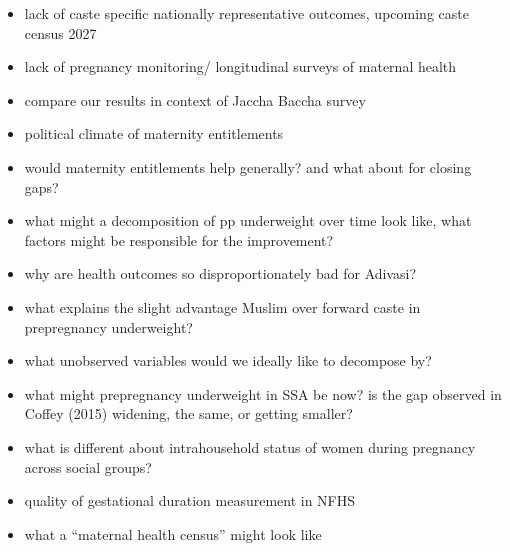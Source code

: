 \documentclass[12pt]{article}
\begin{document}
\begin{itemize}
    \item lack of caste specific nationally representative outcomes, upcoming caste census 2027
    \item lack of pregnancy monitoring/ longitudinal surveys of maternal health
    \item compare our results in context of Jaccha Baccha survey
    \item political climate of maternity entitlements
    \item would maternity entitlements help generally? and what about for closing gaps?
    \item what might a decomposition of pp underweight over time look like, what factors might be responsible for the improvement?
    \item why are health outcomes so disproportionately bad for Adivasi?
    \item what explains the slight advantage Muslim over forward caste in prepregnancy underweight?
    \item what unobserved variables would we ideally like to decompose by?
    \item what might prepregnancy underweight in SSA be now? is the gap observed in Coffey (2015) widening, the same, or getting smaller?
    \item what is different about intrahousehold status of women during pregnancy across social groups?
    \item quality of gestational duration measurement in NFHS
    \item what a “maternal health census” might look like 
\end{itemize}
\end{document}
